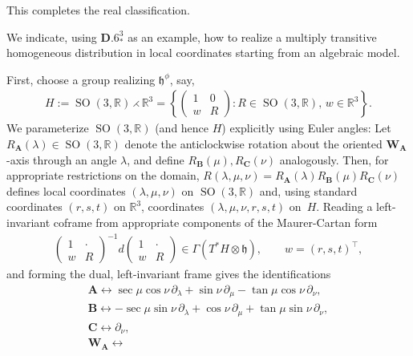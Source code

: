 \documentclass[pdftex]{sigma}
\DeclareMathOperator{\SO} {SO}
\newcommand{\bbR}{\mathbb{R}}
\newcommand{\mbA}{\mathbf{A}}
\newcommand{\mbB}{\mathbf{B}}
\newcommand{\mbC}{\mathbf{C}}
\newcommand{\mbW}{\mathbf{W}}
\newcommand{\mfh} {\mathfrak{h}}
\numberwithin{equation}{section}
\begin{document}
This completes the real classification.

\begin{Example}\label{example:D.6-ast-coordinates}
We indicate, using $\mathbf{D.6}_{\ast}^3$ as an example, how to realize a multiply transitive homogeneous distribution in local coordinates starting from an algebraic model.

First, choose a group realizing $\mfh^{\phi}$, say,
\begin{gather*}
	H
		:= \SO(3, \bbR) \rightthreetimes \bbR^3
		=
	\left\{
		\begin{pmatrix}
			1 & 0 \\
			w & R
		\end{pmatrix}
	\colon
		R \in \SO(3, \bbR),\, w \in \bbR^3
	\right\} .
\end{gather*}
We parameterize $\SO(3, \bbR)$ (and hence $H$) explicitly using Euler angles: Let $R_{\mbA}(\lambda) \in \SO(3, \bbR)$ denote the anticlockwise rotation about the oriented $\mbW_{\mbA}$-axis through an angle $\lambda$, and define $R_{\mbB}(\mu), R_{\mbC}(\nu)$ analogously. Then, for appropriate restrictions on the domain, $R(\lambda, \mu, \nu) = R_{\mbA}(\lambda) R_{\mbB}(\mu) R_{\mbC}(\nu)$ defines local coordinates $(\lambda, \mu, \nu)$ on $\SO(3, \bbR)$ and, using standard coordinates $(r, s, t)$ on $\bbR^3$, coordinates $(\lambda, \mu, \nu, r, s, t)$ on~$H$. Reading a left-invariant coframe from appropriate components of the Maurer-Cartan form
\begin{gather*}
	\begin{pmatrix}
		1 & \cdot \\
		w & R
	\end{pmatrix}^{-1}
	d
	\begin{pmatrix}
		1 & \cdot \\
		w & R
	\end{pmatrix}
 \in \Gamma(T^*H \otimes \mfh),
 \qquad w = (r, s, t)^{\top} ,
\end{gather*}
and forming the dual, left-invariant frame gives the identifications
\begin{gather*}
	\mbA\leftrightarrow
		\sec \mu \cos \nu \,\partial_{\lambda}
			+ \sin \nu \, \partial_{\mu}
			- \tan \mu \cos \nu \,\partial_{\nu} , \\
	\mbB\leftrightarrow
		-\sec \mu \sin \nu \,\partial_{\lambda}
			+ \cos \nu \,\partial_{\mu}
			+ \tan \mu \sin \nu \,\partial_{\nu} , \\
	\mbC\leftrightarrow
		\partial_{\nu} , \\
	\mbW_{\mbA}\leftrightarrow

\end{gather*}
\end{Example}
\end{document}
